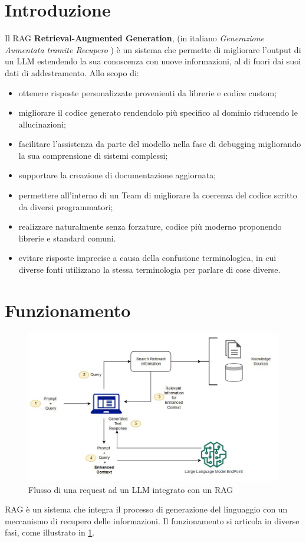 \documentclass[12pt,a4paper,openright,twoside]{book}
\begin{document}
\section{Introduzione}
Il RAG \textbf{Retrieval-Augmented Generation}, (in italiano \textit{Generazione Aumentata tramite Recupero} )  è un sistema che permette di migliorare l'output di un LLM estendendo la sua conoscenza con nuove informazioni, al di fuori dai suoi dati di addestramento.
Allo scopo di:
\begin{itemize}
    \item ottenere risposte personalizzate provenienti da librerie e codice custom;
    \item migliorare il codice generato rendendolo più specifico al dominio riducendo le allucinazioni;
    \item facilitare l'assistenza da parte del modello nella fase di debugging migliorando la sua comprensione di sistemi complessi;
    \item supportare la creazione di documentazione aggiornata;
    \item permettere all'interno di un Team di migliorare la coerenza del codice scritto da diversi programmatori;
    \item realizzare naturalmente senza forzature, codice più moderno proponendo librerie e standard comuni.
    \item evitare risposte imprecise a causa della confusione terminologica, in cui diverse fonti utilizzano la stessa terminologia per parlare di cose diverse.
\end{itemize}

\section{Funzionamento}

\begin{figure}[h]
    \centering
    \includegraphics[width=.8\linewidth]{figures/jumpstart-fm-rag.jpg}
    \caption{Flusso di una request ad un LLM integrato con un RAG}
    \label{fig:jumpstart-fm-rag}
\end{figure}
RAG è un sistema che integra il processo di generazione del linguaggio con un meccanismo di recupero delle informazioni. Il funzionamento si articola in diverse fasi, come illustrato in \cref{fig:jumpstart-fm-rag}.
\end{document}
